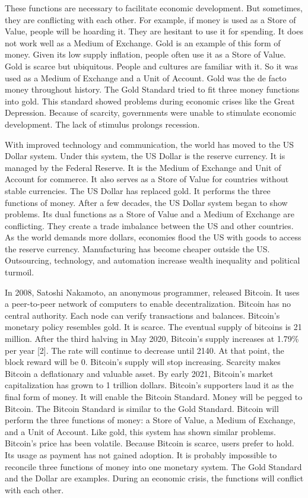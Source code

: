 \documentclass{article}      %
\begin{document}
These functions are necessary to facilitate economic development. But sometimes, they are conflicting with each other. For example, if money is used as a Store of Value, people will be hoarding it. They are hesitant to use it for spending. It does not work well as a Medium of Exchange. Gold is an example of this form of money. Given its low supply inflation, people often use it as a Store of Value. Gold is scarce but ubiquitous. People and cultures are familiar with it. So it was used as a Medium of Exchange and a Unit of Account. Gold was the de facto money throughout history. The Gold Standard tried to fit three money functions into gold. This standard showed problems during economic crises like the Great Depression. Because of scarcity, governments were unable to stimulate economic development. The lack of stimulus prolongs recession.

With improved technology and communication, the world has moved to the US Dollar system. Under this system, the US Dollar is the reserve currency. It is managed by the Federal Reserve. It is the Medium of Exchange and Unit of Account for commerce. It also serves as a Store of Value for countries without stable currencies. The US Dollar has replaced gold. It performs the three functions of money. After a few decades, the US Dollar system began to show problems. Its dual functions as a Store of Value and a Medium of Exchange are conflicting. They create a trade imbalance between the US and other countries. As the world demands more dollars, economies flood the US with goods to access the reserve currency. Manufacturing has become cheaper outside the US. Outsourcing, technology, and automation increase wealth inequality and political turmoil.

In 2008, Satoshi Nakamoto, an anonymous programmer, released Bitcoin. It uses a peer-to-peer network of computers to enable decentralization. Bitcoin has no central authority. Each node can verify transactions and balances. Bitcoin's monetary policy resembles gold. It is scarce. The eventual supply of bitcoins is 21 million. After the third halving in May 2020, Bitcoin's supply increases at 1.79\% per year [2]. The rate will continue to decrease until 2140. At that point, the block reward will be 0. Bitcoin's supply will stop increasing. Scarcity makes Bitcoin a deflationary and valuable asset. By early 2021, Bitcoin's market capitalization has grown to 1 trillion dollars. Bitcoin's supporters laud it as the final form of money. It will enable the Bitcoin Standard. Money will be pegged to Bitcoin. The Bitcoin Standard is similar to the Gold Standard. Bitcoin will perform the three functions of money: a Store of Value, a Medium of Exchange, and a Unit of Account. Like gold, this system has shown similar problems. Bitcoin's price has been volatile. Because Bitcoin is scarce, users prefer to hold. Its usage as payment has not gained adoption. It is probably impossible to reconcile three functions of money into one monetary system. The Gold Standard and the Dollar are examples. During an economic crisis, the functions will conflict with each other.
\end{document}
